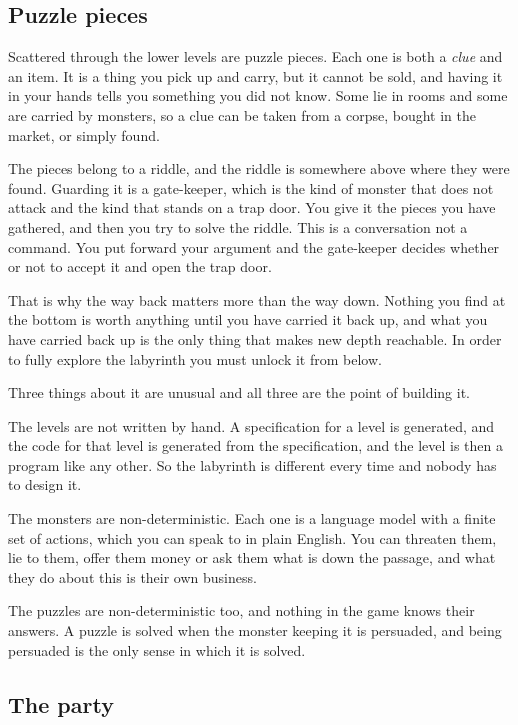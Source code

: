 \documentclass[11pt,a4paper]{article}
\begin{document}
\subsection{Puzzle pieces}
\label{sec:puzzlepieces}

Scattered through the lower levels are puzzle pieces. Each one is both a \emph{clue} and an
item. It is a thing you pick up and carry, but it cannot be sold, and having it in your hands
tells you something you did not know. Some lie in rooms and some are carried by monsters, so a
clue can be taken from a corpse, bought in the market, or simply found.

The pieces belong to a riddle, and the riddle is somewhere above where they were found. Guarding
it is a gate-keeper, which is the kind of monster that does not attack and the kind that stands on
a trap door. You give it the pieces you have gathered, and then you try to solve the riddle. This
is a conversation not a command. You put forward your argument and the gate-keeper decides whether
or not to accept it and open the trap door.

\begin{sectionbox}
That is why the way back matters more than the way down. Nothing you find at the bottom is worth
anything until you have carried it back up, and what you have carried back up is the only thing
that makes new depth reachable. In order to fully explore the labyrinth you must unlock it from
below.
\end{sectionbox}

Three things about it are unusual and all three are the point of building it.

The levels are not written by hand. A specification for a level is generated, and the code for
that level is generated from the specification, and the level is then a program like any other.
So the labyrinth is different every time and nobody has to design it.

The monsters are non-deterministic. Each one is a language model with a finite set of actions,
which you can speak to in plain English. You can threaten them, lie to them,
offer them money or ask them what is down the passage, and what they do about this is their own
business.

The puzzles are non-deterministic too, and nothing in the game knows their answers. A puzzle is
solved when the monster keeping it is persuaded, and being persuaded is the only sense in which
it is solved.

\subsection{The party}
\label{sec:party}
\end{document}
